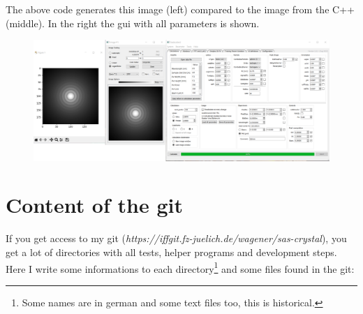 \documentclass[11pt]{article} %
\begin{document}
The above code generates this image (left) compared to the image from the C++ (middle). In the right the gui with all parameters is shown.
\begin{figure}[H]
 \centering
 \includegraphics[width=\textwidth]{Python2C.png}
\end{figure}



\clearpage
\appendix



\section{Content of the git}

If you get access to my git ({\it https://iffgit.fz-juelich.de/wagener/sas-crystal}), you get a lot of directories with all tests, helper programs and development steps. Here I write some informations to each directory\footnote{Some names are in german and some text files too, this is historical.} and some files found in the git:
\end{document}
